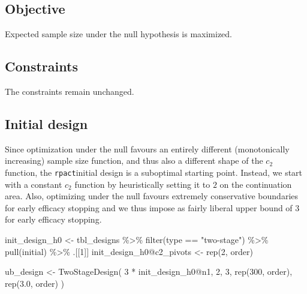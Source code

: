 \documentclass[
]{book}
\newenvironment{Shaded}{\begin{snugshade}}{\end{snugshade}}
\newcommand{\DecValTok}[1]{\textcolor[rgb]{0.00,0.00,0.81}{#1}}
\newcommand{\FloatTok}[1]{\textcolor[rgb]{0.00,0.00,0.81}{#1}}
\newcommand{\FunctionTok}[1]{\textcolor[rgb]{0.00,0.00,0.00}{#1}}
\newcommand{\NormalTok}[1]{#1}
\newcommand{\OtherTok}[1]{\textcolor[rgb]{0.56,0.35,0.01}{#1}}
\newcommand{\SpecialCharTok}[1]{\textcolor[rgb]{0.00,0.00,0.00}{#1}}
\newcommand{\StringTok}[1]{\textcolor[rgb]{0.31,0.60,0.02}{#1}}
\begin{document}
\hypertarget{objective-15}{%
\subsection{Objective}\label{objective-15}}

Expected sample size under the null hypothesis is maximized.

\hypertarget{constraints-15}{%
\subsection{Constraints}\label{constraints-15}}

The constraints remain unchanged.

\hypertarget{initial-design-12}{%
\subsection{Initial design}\label{initial-design-12}}

Since optimization under the null favours an entirely different (monotonically increasing) sample size function, and thus also a different shape of the \(c_2\) function, the \texttt{rpact}initial design is a suboptimal starting point. Instead, we start with a constant \(c_2\) function by heuristically setting it to \(2\) on the continuation area. Also, optimizing under the null favours extremely conservative boundaries for early efficacy stopping and we thus impose as fairly liberal upper bound of \(3\) for early efficacy stopping.

\begin{Shaded}
\begin{Highlighting}[]
\NormalTok{init\_design\_h0 }\OtherTok{\textless{}{-}}\NormalTok{ tbl\_designs }\SpecialCharTok{\%\textgreater{}\%} 
    \FunctionTok{filter}\NormalTok{(type }\SpecialCharTok{==} \StringTok{"two{-}stage"}\NormalTok{) }\SpecialCharTok{\%\textgreater{}\%} 
    \FunctionTok{pull}\NormalTok{(initial) }\SpecialCharTok{\%\textgreater{}\%} 
\NormalTok{    .[[}\DecValTok{1}\NormalTok{]]}
\NormalTok{init\_design\_h0}\SpecialCharTok{@}\NormalTok{c2\_pivots }\OtherTok{\textless{}{-}} \FunctionTok{rep}\NormalTok{(}\DecValTok{2}\NormalTok{, order)}

\NormalTok{ub\_design }\OtherTok{\textless{}{-}} \FunctionTok{TwoStageDesign}\NormalTok{(}
    \DecValTok{3} \SpecialCharTok{*}\NormalTok{ init\_design\_h0}\SpecialCharTok{@}\NormalTok{n1,}
    \DecValTok{2}\NormalTok{,}
    \DecValTok{3}\NormalTok{,}
    \FunctionTok{rep}\NormalTok{(}\DecValTok{300}\NormalTok{, order),}
    \FunctionTok{rep}\NormalTok{(}\FloatTok{3.0}\NormalTok{, order)}
\NormalTok{)}
\end{Highlighting}
\end{Shaded}
\end{document}
